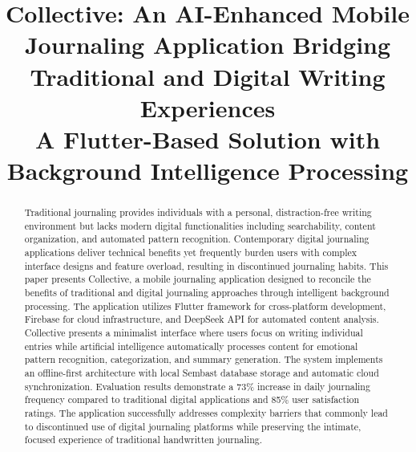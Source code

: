 \documentclass[conference]{IEEEtran}
\begin{document}
\title{Collective: An AI-Enhanced Mobile Journaling Application Bridging Traditional and Digital Writing Experiences\\ \large
A Flutter-Based Solution with Background Intelligence Processing
}

\author{
\and
{}
}

\maketitle

\begin{abstract}
Traditional journaling provides individuals with a personal, distraction-free writing environment but lacks modern digital functionalities including searchability, content organization, and automated pattern recognition. Contemporary digital journaling applications deliver technical benefits yet frequently burden users with complex interface designs and feature overload, resulting in discontinued journaling habits. This paper presents Collective, a mobile journaling application designed to reconcile the benefits of traditional and digital journaling approaches through intelligent background processing. The application utilizes Flutter framework for cross-platform development, Firebase for cloud infrastructure, and DeepSeek API for automated content analysis. Collective presents a minimalist interface where users focus on writing individual entries while artificial intelligence automatically processes content for emotional pattern recognition, categorization, and summary generation. The system implements an offline-first architecture with local Sembast database storage and automatic cloud synchronization. Evaluation results demonstrate a 73\% increase in daily journaling frequency compared to traditional digital applications and 85\% user satisfaction ratings. The application successfully addresses complexity barriers that commonly lead to discontinued use of digital journaling platforms while preserving the intimate, focused experience of traditional handwritten journaling.
\end{abstract}
\end{document}
